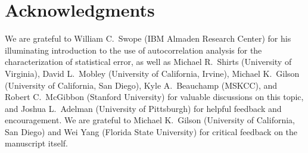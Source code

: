 \documentclass[aps,pre,twocolumn,nofootinbib,superscriptaddress,linenumbers,11point]{revtex4-1}
\begin{document}

\section*{Acknowledgments}

We are grateful to William C.~Swope (IBM Almaden Research Center) for his illuminating introduction to the use of autocorrelation analysis for the characterization of statistical error, as well as Michael R.~Shirts (University of Virginia), David L.~Mobley (University of California, Irvine), Michael K.~Gilson (University of California, San Diego), Kyle A.~Beauchamp (MSKCC), and Robert C.~McGibbon (Stanford University) for valuable discussions on this topic, and Joshua L.~Adelman (University of Pittsburgh) for helpful feedback and encouragement.
We are grateful to Michael K.~Gilson (University of California, San Diego) and Wei Yang (Florida State University) for critical feedback on the manuscript itself.


 

\end{document}
